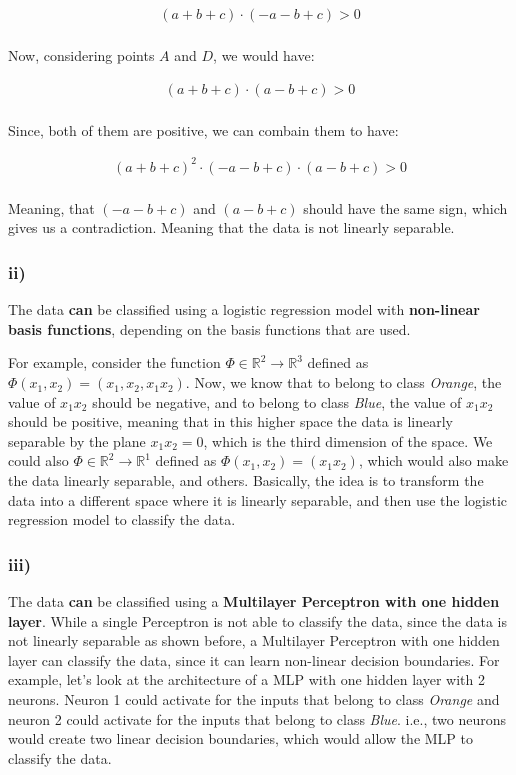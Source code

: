 \documentclass[12pt,a4paper,oneside]{paper}
\begin{document}
\begin{align*}
    (a + b + c) \cdot (-a - b + c) > 0 \\
\end{align*}

Now, considering points $A$ and $D$, we would have:

\begin{align*}
    (a + b + c) \cdot (a - b + c) > 0 \\
\end{align*}

Since, both of them are positive, we can combain them to have:

\begin{align*}
    (a + b + c)^2 \cdot (-a - b + c) \cdot (a - b + c) > 0 \\ 
\end{align*}

Meaning, that $(-a - b + c)$ and $(a - b + c)$ should have the same sign, which gives us a contradiction. Meaning that the data is not linearly separable.

\subsubsection*{ii)}

The data \textbf{can} be classified using a logistic regression model with \textbf{non-linear basis functions},
depending on the basis functions that are used.

For example, consider the function $\Phi \in \mathbb{R}^2 \rightarrow \mathbb{R}^3$ defined as $\Phi(x_1, x_2) = (x_1, x_2, x_1 x_2)$.
Now, we know that to belong to class \textit{Orange}, the value of $x_1 x_2$ should be negative, and to belong to class \textit{Blue}, the value of $x_1 x_2$ should be positive, 
meaning that in this higher space the data is linearly separable by the plane $x_1 x_2 = 0$, which is the third dimension of the space. 
We could also $\Phi \in \mathbb{R}^2 \rightarrow \mathbb{R}^1$ defined as $\Phi(x_1, x_2) = (x_1 x_2)$, which would also make the data linearly separable, and others. 
Basically, the idea is to transform the data into a different space where it is linearly separable, and then use the logistic regression model to classify the data.

\subsubsection*{iii)}

The data \textbf{can} be classified using a \textbf{Multilayer Perceptron with one hidden layer}. 
While a single Perceptron is not able to classify the data, since the data is not linearly separable as shown before,
a Multilayer Perceptron with one hidden layer can classify the data, since it can learn non-linear decision boundaries.
For example, let's look at the architecture of a MLP with one hidden layer with 2 neurons. Neuron 1 could activate
for the inputs that belong to class \textit{Orange} and neuron 2 could activate for the inputs that belong to class \textit{Blue}. i.e., 
two neurons would create two linear decision boundaries, which would allow the MLP to classify the data.
\end{document}
